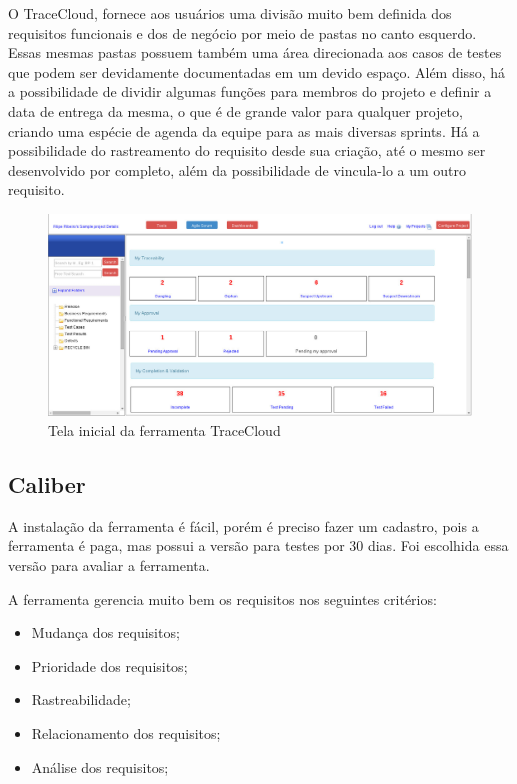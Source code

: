 O TraceCloud, fornece aos usuários uma divisão muito bem definida dos requisitos funcionais e dos de negócio por meio de pastas no canto esquerdo. Essas mesmas pastas possuem também uma área direcionada aos casos de testes que podem ser devidamente documentadas em um devido espaço. Além disso, há a possibilidade de dividir algumas funções para membros do projeto e definir a data de entrega da mesma, o que é de grande valor para qualquer projeto, criando uma espécie de agenda da equipe para as mais diversas sprints. Há a possibilidade do rastreamento do requisito desde sua criação, até o mesmo ser desenvolvido por completo, além da possibilidade de vincula-lo a um outro requisito.

\begin{figure}[!htb]
\centering
\includegraphics[scale=0.3]{figuras/trace.jpg}
\caption{Tela inicial da ferramenta TraceCloud}
\label{Rotulo}
\end{figure}

\subsection{Caliber}
A instalação da ferramenta é fácil, porém é preciso fazer um cadastro, pois a ferramenta é paga, mas possui a versão para testes por 30 dias. Foi escolhida essa versão para avaliar a ferramenta.

A ferramenta gerencia muito bem os requisitos nos seguintes critérios:
\begin{itemize}
  \item Mudança dos requisitos;
  \item Prioridade dos requisitos;
  \item Rastreabilidade;
  \item Relacionamento dos requisitos;
  \item Análise dos requisitos;
\end{itemize}

